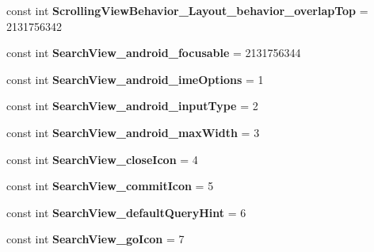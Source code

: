 \begin{DoxyCompactItemize}
const int {\bfseries Scrolling\+View\+Behavior\+\_\+\+Layout\+\_\+behavior\+\_\+overlap\+Top} = 2131756342
\item 
\mbox{\label{classst_delivery_1_1_resource_1_1_styleable_a0f527b79cd43f51a28263b9aa020d4e2}} 
const int {\bfseries Search\+View\+\_\+android\+\_\+focusable} = 2131756344
\item 
\mbox{\label{classst_delivery_1_1_resource_1_1_styleable_aa4937e666532390941f4e98c2e721a15}} 
const int {\bfseries Search\+View\+\_\+android\+\_\+ime\+Options} = 1
\item 
\mbox{\label{classst_delivery_1_1_resource_1_1_styleable_a132fcc37557aa66a050bc2766bf68411}} 
const int {\bfseries Search\+View\+\_\+android\+\_\+input\+Type} = 2
\item 
\mbox{\label{classst_delivery_1_1_resource_1_1_styleable_af42e13cbd84563d605dac5ce80d2f958}} 
const int {\bfseries Search\+View\+\_\+android\+\_\+max\+Width} = 3
\item 
\mbox{\label{classst_delivery_1_1_resource_1_1_styleable_a0fec3ed1f27960633a7d8c0a070f14f6}} 
const int {\bfseries Search\+View\+\_\+close\+Icon} = 4
\item 
\mbox{\label{classst_delivery_1_1_resource_1_1_styleable_a8cf7d20ebf2a99df5a5296a0fa214b4e}} 
const int {\bfseries Search\+View\+\_\+commit\+Icon} = 5
\item 
\mbox{\label{classst_delivery_1_1_resource_1_1_styleable_a442eecfccc1cbbb6b97d627fff5a306a}} 
const int {\bfseries Search\+View\+\_\+default\+Query\+Hint} = 6
\item 
\mbox{\label{classst_delivery_1_1_resource_1_1_styleable_a0e3b718b86fc21b0a31d3f342a3828d4}} 
const int {\bfseries Search\+View\+\_\+go\+Icon} = 7
\item 
\mbox{\label{classst_delivery_1_1_resource_1_1_styleable_acf5969af3925b5a5c84e4ac0c766af92}} 

\end{DoxyCompactItemize}
